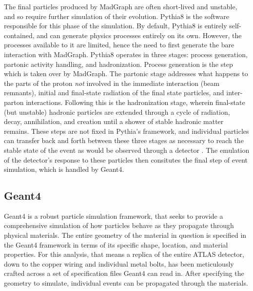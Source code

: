     The final particles produced by MadGraph are often short-lived and unstable,
        and so require further simulation of their evolution.
    Pythia8 is the software responsible for this phase of the simulation. 
    By default, Pythia8 is entirely self-contained, and can generate physics processes entirely on its own.
    However, the processes available to it are limited,
        hence the need to first generate the bare interaction with MadGraph.
    Pythia8 operates in three stages: process generation, partonic activity handling, and hadronization.
    Process generation is the step which is taken over by MadGraph.
    The partonic stage addresses what happens to the parts of the proton \textit{not} involved in the immediate interaction (beam remnants),
        initial and final-state radiation of the final state particles, and inter-parton interactions.
    Following this is the hadronization stage, wherein final-state (but unstable)
        hadronic particles are extended through a cycle of radiation, decay, annihilation, and creation
        until a shower of stable hadronic matter remains.
    These steps are not fixed in Pythia's framework,
        and individual particles can transfer back and forth between these three stages
        as necessary to reach the stable state of the event as would be observed through a detector
        \cite{pythia}.
    The emulation of the detector's response to these particles then consitutes the final step of event simulation,
        which is handled by Geant4.

    \subsection{Geant4}

    Geant4 is a robust particle simulation framework,
        that seeks to provide a comprehensive simulation of how particles behave as they propagate through physical materials.
    The entire geometry of the material in question is specified in the Geant4 framework in terms of
        its specific shape, location, and material properties.
    For this analysis, that means a replica of the entire ATLAS detector,
        down to the copper wiring and individual metal bolts,
        has been meticulously crafted across a set of specification files Geant4 can read in.
    After specifying the geometry to simulate, individual events can be propagated through the materials.

